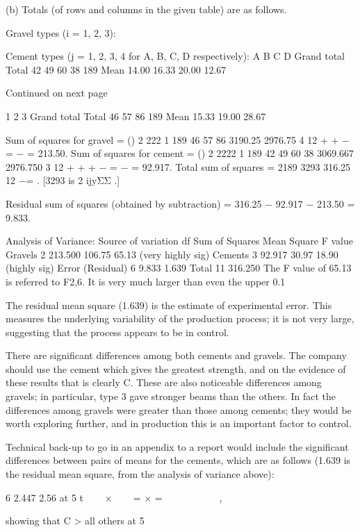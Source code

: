 \documentclass[a4paper,12pt]{article}
\begin{document}
\begin{enumerate}
(b) Totals (of rows and columns in the given table) are as follows. 
 
Gravel types (i = 1, 2, 3): 
 
 
 
Cement types (j = 1, 2, 3, 4 for A, B, C, D respectively): 
  A B C D Grand total Total 42 49 60 38 189 Mean 14.00 16.33 20.00 12.67  
 
Continued on next page 
 
 1 2 3 Grand total Total 46 57 86 189 Mean 15.33 19.00 28.67  

 
 
Sum of squares for gravel = () 2 222 1 189 46 57 86 3190.25 2976.75 4 12 + + − = −  = 213.50. Sum of squares for cement = () 2 2222 1 189 42 49 60 38 3069.667 2976.750 3 12 + + + − = − = 92.917. Total sum of squares = 2189 3293 316.25 12 −= .        [3293 is 2 ijyΣΣ .] 
 
Residual sum of squares (obtained by subtraction) = 316.25 − 92.917 − 213.50 = 9.833. 
 
Analysis of Variance: 
 Source of variation df Sum of Squares Mean Square F value Gravels   2 213.500 106.75 65.13  (very highly sig) Cements   3   92.917   30.97 18.90   (highly sig) Error (Residual)   6     9.833       1.639  Total 11 316.250   
 The F value of 65.13 is referred to F2,6.  It is very much larger than even the upper 0.1%
 
The residual mean square (1.639) is the estimate of experimental error.  This measures the underlying variability of the production process;  it is not very large, suggesting that the process appears to be in control. 
 
There are significant differences among both cements and gravels.  The company should use the cement which gives the greatest strength, and on the evidence of these results that is clearly C.  These are also noticeable differences among gravels;  in particular, type 3 gave stronger beams than the others.  In fact the differences among gravels were greater than those among cements;  they would be worth exploring further, and in production this is an important factor to control. 
 
 
Technical back-up to go in an appendix to a report would include the significant differences between pairs of means for the cements, which are as follows (1.639 is the residual mean square, from the analysis of variance above): 
 
6
2.447 2.56 at 5%
t
   ×    = × =         
  , 
 
showing that C > all others at 5%

\end{enumerate}
\end{document}
